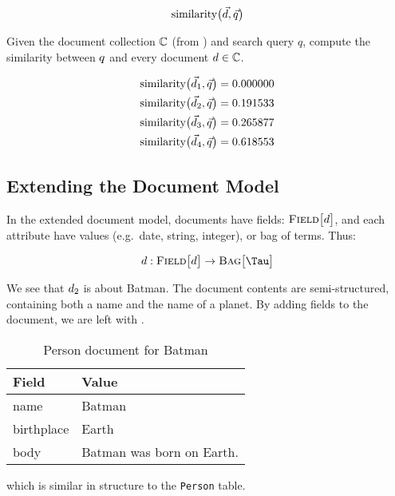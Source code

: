 		\[
			\operatorname{similarity}\bigl(\vec{d}, \vec{q}\bigr)
		\]
		
		\begin{ex}
			Given the document collection $\mathbb{C}$ (from ) and search query $q$, compute the similarity between $q$ and every document $d \in \mathbb{C}$.
			
			\begin{align}
				\operatorname{similarity}\bigl(\vec{d}_1, \vec{q}\bigr) &= 0.000000 \\
				\operatorname{similarity}\bigl(\vec{d}_2, \vec{q}\bigr) &= 0.191533 \\
				\operatorname{similarity}\bigl(\vec{d}_3, \vec{q}\bigr) &= 0.265877 \\
				\operatorname{similarity}\bigl(\vec{d}_4, \vec{q}\bigr) &= 0.618553
			\end{align}
		\end{ex}
		
	\subsection{Extending the Document Model}
	\label{sec:extending-the-document-model}
		In the extended document model, documents have fields: $\textsc{Field}\bigl[d\bigr]$, and each attribute have values (e.g.~date, string, integer), or bag of terms.  Thus:

		\[
			\doc : \fields{\doc} \to \bag{\terms}
		\]
		
		\begin{ex}
			We see that $d_2$ is about Batman.  The document contents are semi-structured, containing both a name and the name of a planet.	By adding fields to the document, we are left with \Vref{tbl:person-document}.
			
			\begin{table}[!ht]
				\centering
				
				\begin{tabular}{ll}
					\toprule
					Field & Value \\
					\midrule
					name & Batman \\
					birthplace & Earth \\
					body & Batman was born on Earth. \\
					\bottomrule
				\end{tabular}
				
				\caption{Person document for Batman}
				\label{tbl:person-document}
			\end{table}
			
			which is similar in structure to the \texttt{Person} table.
		\end{ex}
		

